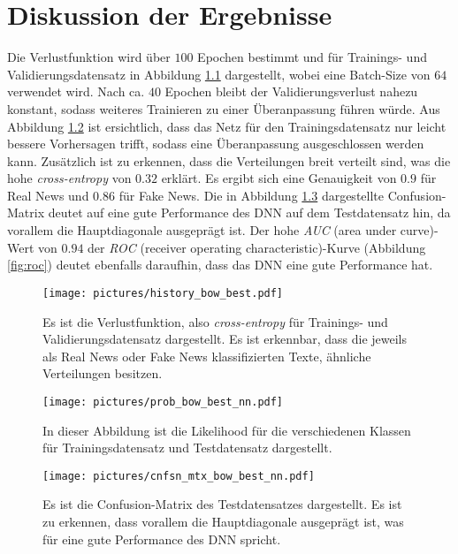 \chapter{Diskussion der Ergebnisse}
Die Verlustfunktion wird über $100$ Epochen bestimmt und für Trainings- und Validierungsdatensatz 
in Abbildung \ref{fig:history} dargestellt, wobei eine Batch-Size von $64$ verwendet wird. Nach ca.
$40$ Epochen bleibt der Validierungsverlust nahezu konstant, sodass weiteres Trainieren zu einer 
Überanpassung führen würde. Aus Abbildung \ref{fig:likelihood} ist ersichtlich, dass das Netz 
für den Trainingsdatensatz nur leicht bessere Vorhersagen trifft, sodass eine Überanpassung 
ausgeschlossen werden kann. Zusätzlich ist zu erkennen, dass die Verteilungen breit verteilt
sind, was die hohe \textit{cross-entropy} von $0.32$ erklärt. Es ergibt sich eine Genauigkeit 
von $0.9$ für Real News und $0.86$ für Fake News. Die in Abbildung \ref{fig:cnfsn__mtx}
dargestellte Confusion-Matrix deutet auf eine gute Performance des DNN auf dem Testdatensatz hin,
da vorallem die Hauptdiagonale ausgeprägt ist. Der hohe \textit{AUC} (area under curve)-Wert 
von $0.94$ der \textit{ROC} (receiver operating characteristic)-Kurve (Abbildung \ref{fig:roc})
deutet ebenfalls daraufhin, dass das DNN eine gute Performance hat.
\begin{figure}
    \centering
    \texttt{[image: pictures/history\_bow\_best.pdf]}
    \caption{Es ist die Verlustfunktion, also \textit{cross-entropy} für Trainings- und 
    Validierungsdatensatz dargestellt. Es ist erkennbar, dass die jeweils als Real News 
    oder Fake News klassifizierten Texte, ähnliche Verteilungen besitzen.}
    \label{fig:history}
\end{figure}

\begin{figure}
    \centering
    \texttt{[image: pictures/prob\_bow\_best\_nn.pdf]}
    \caption{In dieser Abbildung ist die Likelihood für die verschiedenen Klassen für Trainingsdatensatz 
    und Testdatensatz dargestellt.}
    \label{fig:likelihood}
\end{figure}

\begin{figure}
    \centering
    \texttt{[image: pictures/cnfsn\_mtx\_bow\_best\_nn.pdf]}
    \caption{Es ist die Confusion-Matrix des Testdatensatzes dargestellt. Es ist 
    zu erkennen, dass vorallem die Hauptdiagonale ausgeprägt ist, was für eine 
    gute Performance des DNN spricht.}
    \label{fig:cnfsn__mtx}
\end{figure}

